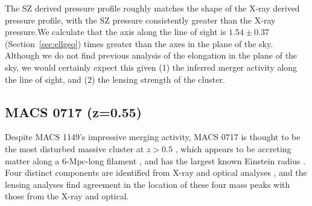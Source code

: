 \documentclass[iop,numberedappendix,apj]{emulateapj}
\begin{document}
The SZ derived pressure profile roughly matches the shape of the X-ray derived pressure profile, 
with the SZ pressure consistently greater than the X-ray pressure.We calculate
that the axis along the line of sight is $1.54 \pm 0.37$ (Section~\ref{sec:ellgeo}) times greater than the axes in the plane
of the sky. Although we do not find previous analysis of the elongation in the plane of the sky, we would certainly
expect this given (1) the inferred merger activity along the line of sight, and (2) the lensing strength of the cluster.



\subsection{MACS 0717 (z=0.55)}
\label{sec:results_m0717}



Despite MACS 1149's impressive merging activity, MACS 0717 is thought to be the most disturbed massive cluster at $z> 0.5$
\citep{ebeling2007}, which appears to be accreting matter along a 6-Mpc-long filament \citep{ebeling2004}, and has the
largest known Einstein radius \citep[$\theta_e \sim 55$\asec;][]{zitrin2009}. Four distinct components are identified
from X-ray and optical analyses \citep{ma2009}, and the lensing analyses \citep{zitrin2009,limousin2012} find agreement
in the location of these four mass peaks with those from the X-ray and optical. 
\end{document}
